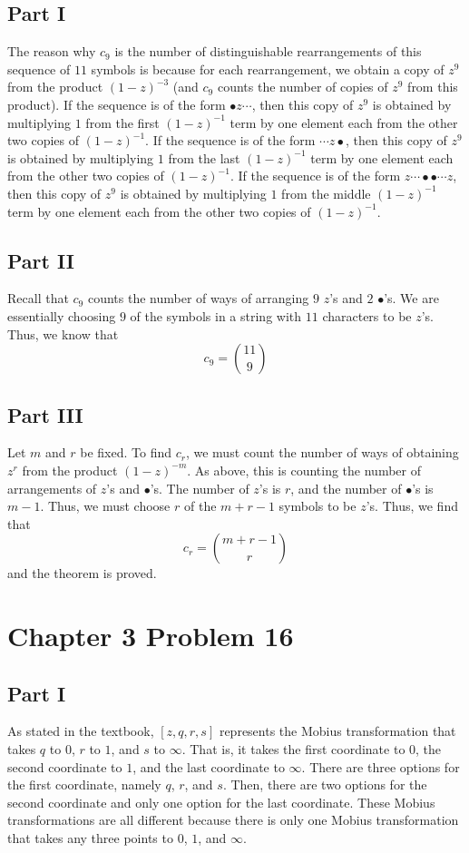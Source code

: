 \documentclass[12pt]{article}
\begin{document}
\subsection*{Part I}
The reason why $c_9$ is the number of distinguishable rearrangements of this sequence of $11$ symbols is because for each rearrangement, we obtain a copy of $z^9$ from the product $(1-z)^{-3}$ (and $c_9$ counts the number of copies of $z^9$ from this product). If the sequence is of the form $\bullet z \cdots$, then this copy of $z^9$ is obtained by multiplying $1$ from the first $(1-z)^{-1}$ term by one element each from the other two copies of $(1-z)^{-1}$. If the sequence is of the form $\cdots z \bullet$, then this copy of $z^9$ is obtained by multiplying $1$ from the last $(1-z)^{-1}$ term by one element each from the other two copies of $(1-z)^{-1}$. If the sequence is of the form $z\cdots \bullet \bullet \cdots z$, then this copy of $z^9$ is obtained by multiplying $1$ from the middle $(1-z)^{-1}$ term by one element each from the other two copies of $(1-z)^{-1}$.
\subsection*{Part II}
Recall that $c_9$ counts the number of ways of arranging $9$ $z$'s and $2$ $\bullet$'s. We are essentially choosing $9$ of the symbols in a string with $11$ characters to be $z$'s. Thus, we know that
\[
c_9 = \binom{11}{9}
\]
\subsection*{Part III}
Let $m$ and $r$ be fixed. To find $c_r$, we must count the number of ways of obtaining $z^r$ from the product $(1-z)^{-m}$. As above, this is counting the number of arrangements of $z$'s and $\bullet$'s. The number of $z$'s is $r$, and the number of $\bullet$'s is $m-1$. Thus, we must choose $r$ of the $m+r-1$ symbols to be $z$'s. Thus, we find that
\[
c_r = \binom{m+r-1}{r}
\] and the theorem is proved.
\newpage
\section*{Chapter 3 Problem 16}
\subsection*{Part I}
As stated in the textbook, $[z,q,r,s]$ represents the Mobius transformation that takes $q$ to $0$, $r$ to $1$, and $s$ to $\infty$. That is, it takes the first coordinate to $0$, the second coordinate to $1$, and the last coordinate to $\infty$. There are three options for the first coordinate, namely $q$, $r$, and $s$. Then, there are two options for the second coordinate and only one option for the last coordinate. These Mobius transformations are all different because there is only one Mobius transformation that takes any three points to $0$, $1$, and $\infty$.
\end{document}
